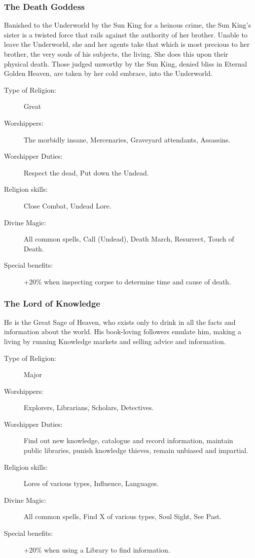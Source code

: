 \subsubsection{The Death Goddess}
Banished to the Underworld by the Sun King for a heinous crime, the Sun King’s sister is a twisted force that rails against the authority of her brother. Unable to leave the Underworld, she and her agents take that which is most precious to her brother, the very souls of his subjects, the living. She does this upon their physical death. Those judged unworthy by the Sun King, denied bliss in Eternal Golden Heaven, are taken by her cold embrace, into the Underworld. 

\begin{description}
\item[Type of Religion:] Great
\item[Worshippers:] The morbidly insane, Mercenaries, Graveyard attendants, Assassins.
\item[Worshipper Duties:] Respect the dead, Put down the Undead.
\item[Religion skills:] Close Combat, Undead Lore. 
\item[Divine Magic:] All common spells, Call (Undead), Death March, Resurrect, Touch of Death.
\item[Special benefits:] +20\% when inspecting corpse to determine time and cause of death.
\end{description}


\subsubsection{The Lord of Knowledge}
He is the Great Sage of Heaven, who exists only to drink in all the facts and information about the world. His book-loving followers emulate him, making a living by running Knowledge markets and selling advice and information.

\begin{description}
\item[Type of Religion:] Major
\item[Worshippers:] Explorers, Librarians, Scholars, Detectives.
\item[Worshipper Duties:] Find out new knowledge, catalogue and record information, maintain public libraries, punish knowledge thieves, remain unbiased and impartial.
\item[Religion skills:] Lores of various types, Influence, Languages.
\item[Divine Magic:] All common spells, Find X of various types, Soul Sight, See Past.
\item[Special benefits:] +20\% when using a Library to find information.
\end{description}



